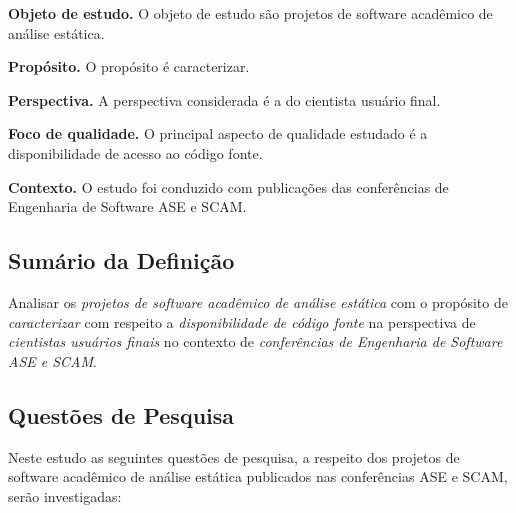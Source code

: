 \begin{description}
\item{\bf Objeto de estudo.} 
O objeto de estudo são projetos de software acadêmico de análise estática.

\item{\bf Propósito.} 
O propósito é caracterizar.

\item{\bf Perspectiva.} 
A perspectiva considerada é a do cientista usuário final.

\item{\bf Foco de qualidade.} 
O principal aspecto de qualidade estudado é a disponibilidade de acesso ao código fonte.

\item{\bf Contexto.} 
O estudo foi conduzido com publicações das conferências de Engenharia de Software ASE e SCAM.

\end{description}

\subsection{Sumário da Definição}

Analisar os \textit{projetos de software acadêmico de análise estática}
com o propósito de \textit{caracterizar}
com respeito a \textit{disponibilidade de código fonte}
na perspectiva de \textit{cientistas usuários finais}
no contexto de \textit{conferências de Engenharia de Software ASE e SCAM}.

\subsection{Questões de Pesquisa}

Neste estudo as seguintes questões de pesquisa, a respeito dos projetos de
software acadêmico de análise estática publicados nas conferências ASE e SCAM,
serão investigadas:

\newcommand{\EstudoUmQuestaoUm}{
  Os projetos de software acadêmico de análise estática publicados nas conferências ASE e SCAM possuem alguma presença oficial online?
}
\newcommand{\EstudoUmQuestaoDois}{
  Os projetos de software academico de análise estática publicados nas conferências ASE e SCAM estão disponíveis para download?
}
\newcommand{\EstudoUmQuestaoTres}{
  É possível ter acesso ao código fonte dos projetos de software de análise estática publicados nas conferências ASE e SCAM?
}
\newcommand{\EstudoUmQuestaoQuatro}{
  Os projetos de software com código fonte disponível podem ser adaptados para atender necessidades emergentes?
}

